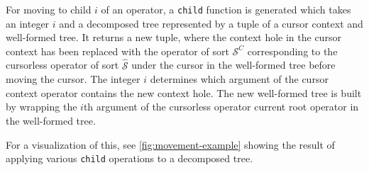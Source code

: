 \documentclass[sigplan,review]{acmart}
\begin{document}
For moving to child $i$ of an operator, a \texttt{child} function is generated
which takes an integer $i$ and a decomposed tree represented by a tuple of a cursor
context and well-formed tree. It returns a new tuple, where the context hole in
the cursor context has been replaced with the operator of sort $\mathcal{S}^C$ corresponding to the cursorless
operator of sort $\hat{\mathcal{S}}$ under the cursor in the well-formed tree before
moving the cursor. The integer $i$ determines which argument of the cursor context
operator contains the new context hole. The new well-formed tree is built by
wrapping the $i$th argument of the cursorless operator current root operator
in the well-formed tree.

For a visualization of this, see \cref{fig:movement-example} showing the result
of applying various \texttt{child} operations to a decomposed tree.
\end{document}
